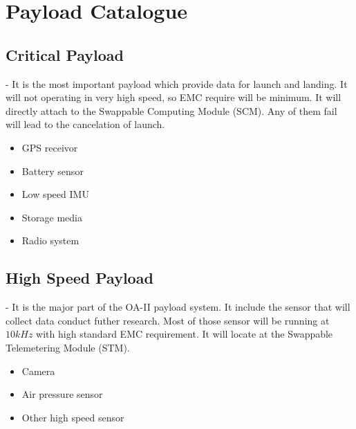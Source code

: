 \documentclass[12pt,article]{memoir}
\begin{document}
\section{Payload Catalogue}
\subsection{Critical Payload} - It is the most important payload which provide data for launch and landing. It will not operating in very high speed, so EMC require will be minimum. It will directly attach to the Swappable Computing Module (SCM). Any of them fail will lead to the cancelation of launch.
\begin{itemize}
\item GPS receivor
\item Battery sensor
\item Low speed IMU
\item Storage media
\item Radio system
\end{itemize}
\subsection{High Speed Payload} - It is the major part of the OA-II payload system. It include the sensor that will collect data conduct futher research. Most of those sensor will be running at $10kHz$ with high standard EMC requirement. It will locate at the Swappable Telemetering Module (STM).
\begin{itemize}
\item Camera
\item Air pressure sensor
\item Other high speed sensor
\end{itemize}
\end{document}
